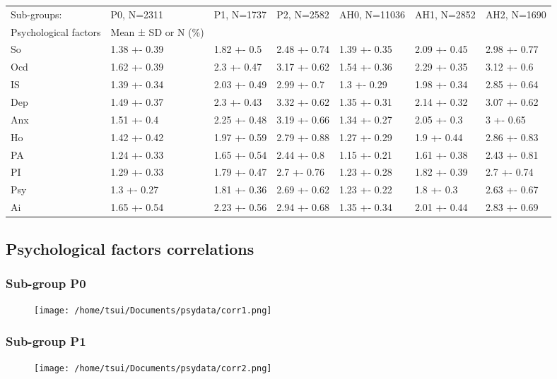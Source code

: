 \documentclass[11pt]{article}
\begin{document}
\begin{center}
\begin{tabular}{lllllll}
Sub-groups: & P0, N=2311 & P1, N=1737 & P2, N=2582 & AH0, N=11036 & AH1, N=2852 & AH2, N=1690\\
Psychological factors & Mean ± SD or N (\%) &  &  &  &  & \\
\hline
So & 1.38 +- 0.39 & 1.82 +- 0.5 & 2.48 +- 0.74 & 1.39 +- 0.35 & 2.09 +- 0.45 & 2.98 +- 0.77\\
Ocd & 1.62 +- 0.39 & 2.3 +- 0.47 & 3.17 +- 0.62 & 1.54 +- 0.36 & 2.29 +- 0.35 & 3.12 +- 0.6\\
IS & 1.39 +- 0.34 & 2.03 +- 0.49 & 2.99 +- 0.7 & 1.3 +- 0.29 & 1.98 +- 0.34 & 2.85 +- 0.64\\
Dep & 1.49 +- 0.37 & 2.3 +- 0.43 & 3.32 +- 0.62 & 1.35 +- 0.31 & 2.14 +- 0.32 & 3.07 +- 0.62\\
Anx & 1.51 +- 0.4 & 2.25 +- 0.48 & 3.19 +- 0.66 & 1.34 +- 0.27 & 2.05 +- 0.3 & 3 +- 0.65\\
Ho & 1.42 +- 0.42 & 1.97 +- 0.59 & 2.79 +- 0.88 & 1.27 +- 0.29 & 1.9 +- 0.44 & 2.86 +- 0.83\\
PA & 1.24 +- 0.33 & 1.65 +- 0.54 & 2.44 +- 0.8 & 1.15 +- 0.21 & 1.61 +- 0.38 & 2.43 +- 0.81\\
PI & 1.29 +- 0.33 & 1.79 +- 0.47 & 2.7 +- 0.76 & 1.23 +- 0.28 & 1.82 +- 0.39 & 2.7 +- 0.74\\
Psy & 1.3 +- 0.27 & 1.81 +- 0.36 & 2.69 +- 0.62 & 1.23 +- 0.22 & 1.8 +- 0.3 & 2.63 +- 0.67\\
Ai & 1.65 +- 0.54 & 2.23 +- 0.56 & 2.94 +- 0.68 & 1.35 +- 0.34 & 2.01 +- 0.44 & 2.83 +- 0.69\\
\end{tabular}
\end{center}

\subsection{Psychological factors correlations}
\label{sec-4-3}
\subsubsection{Sub-group P0}
\label{sec-4-3-1}
\begin{figure}[htb]
\centering
\texttt{[image: /home/tsui/Documents/psydata/corr1.png]}
\label{P0-corrplot}
\end{figure} 

\subsubsection{Sub-group P1}
\label{sec-4-3-2}
\begin{figure}[htb]
\centering
\texttt{[image: /home/tsui/Documents/psydata/corr2.png]}
\label{P2-corrplot}
\end{figure}
\end{document}
